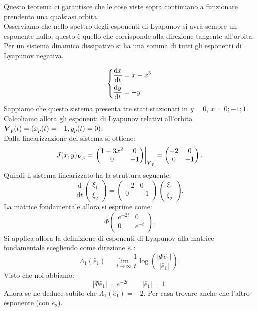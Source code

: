 \noindent
Questo teorema ci garantisce che le cose viste sopra continuano a funzionare prendento una qualsiasi orbita.\\
Osserviamo che nello spettro degli esponenti di Lyapunov si avrà sempre un esponente nullo, questo è quello che corrisponde alla direzione tangente all'orbita.\\
Per un sistema dinamico dissipativo si ha una somma di tutti gli esponenti di Lyapunov negativa.
\begin{exmp}
    \[
    \begin{dcases}
    \frac{\text{d} x}{\text{d} t} = x-x^3\\
    \frac{\text{d} y}{\text{d} t} = -y
    \end{dcases}
    \]
    Sappiamo che questo sistema presenta tre stati stazionari in $y=0$, $x=0; -1; 1$. \\
    Calcoliamo allora gli esponenti di Lyapunov relativi all'orbita $\boldsymbol{V}_p(t) = (x_p(t) = -1, y_p(t) = 0)$.\\
    Dalla linearizzazione del sistema si ottiene:
    \[
	J(x, y)_{\boldsymbol{V}_p}= 
	\left.\begin{pmatrix}
              1-3x^2 & 0 \\
              0 & -1 \\
              \end{pmatrix}
	\right|_{\boldsymbol{V}_p}= 
        \begin{pmatrix}
            -2 & 0 \\
            0 & -1 \\
        \end{pmatrix}
    .\] 
    Quindi il sistema linearizzato ha la struttura seguente:
    \[
        \frac{\text{d} }{\text{d} t} \begin{pmatrix} \xi_1 \\ \xi_2 \end{pmatrix} = 
        \begin{pmatrix}
            -2 & 0 \\
            0 & -1 \\
        \end{pmatrix}
        \begin{pmatrix} \xi_1 \\ \xi_2 \end{pmatrix}
    .\] 
    La matrice fondamentale allora si esprime come:
    \[
	\Phi
        \begin{pmatrix}
            e^{-2t} & 0 \\
            0 & e^{-t} \\
        \end{pmatrix}
    .\] 
    Si applica allora la definizione di esponenti di Lyapunov alla matrice fondamentale scegliendo come direzione $\hat{e}_1$:
    \[
	\Lambda_1 (\hat{e}_1) = 
	\lim_{t \to \infty} \frac{1}{t}\log\left(\frac{\left|\Phi \hat{e}_1 \right|}{\left|\hat{e}_1\right|}\right)
    .\] 
    Visto che noi abbiamo:
    \[
        \left|\Phi\hat{e}_1\right|=e^{-2t } \qquad  \left|\hat{e}_1\right|=1
    .\] 
    Allora se ne deduce subito che $\Lambda_1(\hat{e}_1) = -2$. Per casa trovare anche che l'altro esponente (con $\hat{e}_2$).
\end{exmp}
\noindent
